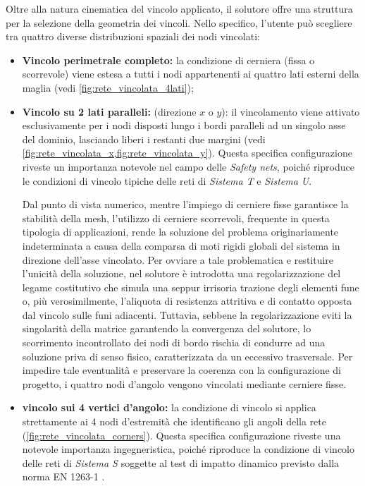 Oltre alla natura cinematica del vincolo applicato, il solutore offre una struttura per la selezione della geometria dei vincoli. Nello specifico, l'utente può scegliere tra quattro diverse distribuzioni spaziali dei nodi vincolati:
\begin{itemize}
   \item \textbf{Vincolo perimetrale completo:} la condizione di cerniera (fissa o scorrevole) viene estesa a tutti i nodi appartenenti ai quattro lati esterni della maglia (vedi \cref{fig:rete_vincolata_4lati});
   \item \textbf{Vincolo su 2 lati paralleli:} (direzione $x$ o $y$): il vincolamento viene attivato esclusivamente per i nodi disposti lungo i bordi paralleli ad un singolo asse del dominio, lasciando liberi i restanti due margini (vedi \cref{fig:rete_vincolata_x,fig:rete_vincolata_y}). Questa specifica configurazione riveste un importanza notevole nel campo delle \textit{Safety nets}, poiché riproduce le condizioni di vincolo tipiche delle reti di \textit{Sistema T} e \textit{Sistema U}. 
   
   Dal punto di vista numerico, mentre l'impiego di cerniere fisse garantisce la stabilità della mesh, l'utilizzo di cerniere scorrevoli, frequente in questa tipologia di applicazioni, rende la soluzione del problema originariamente indeterminata a causa della comparsa di moti rigidi globali del sistema in direzione dell'asse vincolato. Per ovviare a tale problematica e restituire l'unicità della soluzione, nel solutore è introdotta una regolarizzazione del legame costitutivo che simula una seppur irrisoria trazione degli elementi fune o, più verosimilmente, l'aliquota di resistenza attritiva e di contatto opposta dal vincolo sulle funi adiacenti. 
   Tuttavia, sebbene la regolarizzazione eviti la singolarità della matrice garantendo la convergenza del solutore, lo scorrimento incontrollato dei nodi di bordo rischia di condurre ad una soluzione priva di senso fisico, caratterizzata da un eccessivo trasversale. Per impedire tale eventualità e preservare la coerenza con la configurazione di progetto, i quattro nodi d'angolo vengono vincolati mediante cerniere fisse.
   \item \textbf{vincolo sui 4 vertici d'angolo:} la condizione di vincolo si applica strettamente ai 4 nodi d'estremità che identificano gli angoli della rete (\cref{fig:rete_vincolata_corners}). Questa specifica configurazione riveste una notevole importanza ingegneristica, poiché riproduce la condizione di vincolo delle reti di \textit{Sistema S} soggette al test di impatto dinamico previsto dalla norma EN 1263-1 \cite{EN1263-1}.
\end{itemize}

